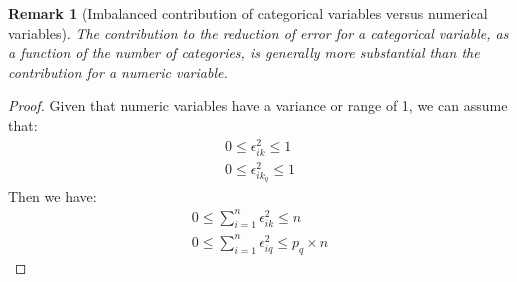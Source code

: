 \documentclass{article}
\newtheorem{rem}{{\sc Remark}}
\theoremstyle{definition}
\begin{document}
\begin{rem}[Imbalanced contribution of categorical variables versus numerical variables]
The contribution to the reduction of error for a categorical variable, as a function of the number of categories, is generally more substantial than the contribution for a numeric variable.
\end{rem}
\begin{proof}
Given that numeric variables have a variance or range of 1, we can assume that:
\begin{align*}
    0 \leq \epsilon_{ik}^2  \leq 1 \\
    0 \leq \epsilon_{ik_q}^2  \leq 1 
\end{align*}
Then we have:
\begin{align*}
    0 \leq \sum_{i=1}^n \epsilon_{ik}^2  \leq n \\
    0 \leq \sum_{i=1}^n \epsilon_{iq}^2  \leq p_q \times n
\end{align*}

\end{proof}



\end{document}
